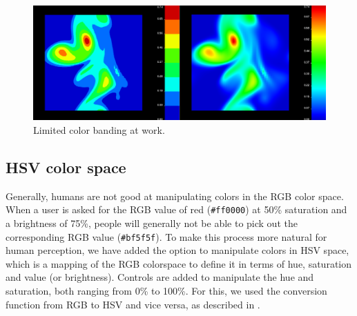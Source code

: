 		\begin{figure}[htb]
			\centering
			\includegraphics[width=\linewidth]{./content/pictures/limit_colors.png}
			\caption{Limited color banding at work.}
			\label{fig:banded_difference}
		\end{figure}

	\subsection{HSV color space}
		Generally, humans are not good at manipulating colors in the RGB color space. 
		When a user is asked for the RGB value of red (\texttt{\#ff0000}) at 50\% saturation and a brightness of 75\%, people will generally not be able to pick out the corresponding RGB value (\texttt{\#bf5f5f}).
		To make this process more natural for human perception, we have added the option to manipulate colors in HSV space, which is a mapping of the RGB colorspace to define it in terms of hue, saturation and value (or brightness).
		Controls are added to manipulate the hue and saturation, both ranging from 0\% to 100\%.
		For this, we used the conversion function from RGB to HSV and vice versa, as described in \cite{telea2014data}.

